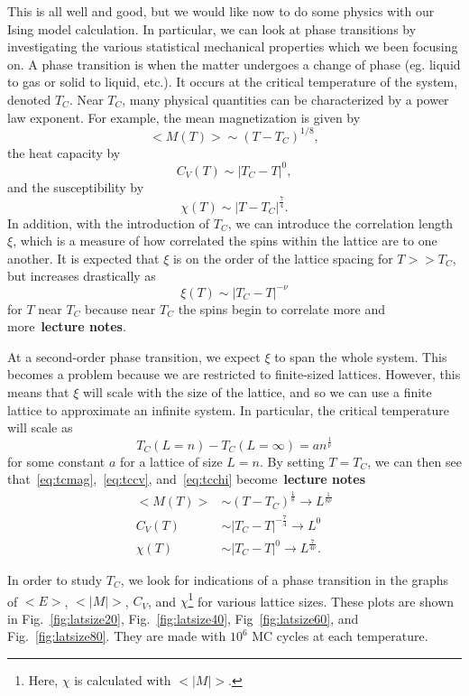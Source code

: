 \documentclass[12pt]{article}
\numberwithin{equation}{section}
\begin{document}
\par This is all well and good, but we would like now to do some physics with our Ising model calculation.  In particular, we can look at phase transitions by investigating the various statistical mechanical properties which we been focusing on.  A phase transition is when the matter undergoes a change of phase (eg. liquid to gas or solid to liquid, etc.).  It occurs at the critical temperature of the system, denoted $T_{C}$.  Near $T_{C}$, many physical quantities can be characterized by a power law exponent.  For example, the mean magnetization is given by
\begin{equation}
\label{eq:tcmag}
<M(T)>\sim(T-T_{C})^{1/8},
\end{equation}
the heat capacity by
\begin{equation}
\label{eq:tccv}
C_{V}(T)\sim|T_{C}-T|^{0},
\end{equation}
and the susceptibility by
\begin{equation}
\label{eq:tcchi}
\chi(T)\sim|T-T_{C}|^{\frac{7}{4}}.
\end{equation}
In addition, with the introduction of $T_{C}$, we can introduce the correlation length $\xi$, which is a measure of how correlated the spins within the lattice are to one another.  It is expected that $\xi$ is on the order of the lattice spacing for $T>>T_{C}$, but increases drastically as
\begin{equation}
\label{eq:tccorr}
\xi(T)\sim|T_{C}-T|^{-\nu}
\end{equation}
for $T$ near $T_{C}$ because near $T_{C}$ the spins begin to correlate more and more~\textbf{lecture notes}.
\par At a second-order phase transition, we expect $\xi$ to span the whole system.  This becomes a problem because we are restricted to finite-sized lattices.  However, this means that $\xi$ will scale with the size of the lattice, and so we can use a finite lattice to approximate an infinite system.  In particular, the critical temperature will scale as
\begin{equation}
\label{eq:tcscale}
T_{C}(L=n)-T_{C}(L=\infty)=an^{\frac{1}{\nu}}
\end{equation}
for some constant $a$ for a lattice of size $L=n$.  By setting $T=T_{C}$, we can then see that~\eqref{eq:tcmag},~\eqref{eq:tccv}, and~\eqref{eq:tcchi} become~\textbf{lecture notes}
\begin{align}
\label{eq:tcquants}
<M(T)> & \sim  (T-T_{C})^{\frac{1}{8}} \rightarrow  L^{\frac{1}{8\nu}} \\
C_{V}(T) & \sim  |T_{C}-T|^{-\frac{7}{4}} \rightarrow  L^{0} \\
\chi(T) & \sim  |T_{C}-T|^{0} \rightarrow L^{\frac{7}{4\nu}}. 
\end{align}
\par In order to study $T_{C}$, we look for indications of a phase transition in the graphs of $<E>$, $<|M|>$, $C_{V}$, and $\chi$\footnote{Here, $\chi$ is calculated with $<|M|>$.} for various lattice sizes.  These plots are shown in Fig.~\ref{fig:latsize20}, Fig.~\ref{fig:latsize40}, Fig~\ref{fig:latsize60}, and Fig.~\ref{fig:latsize80}.  They are made with $10^{6}$ MC cycles at each temperature.
\end{document}

